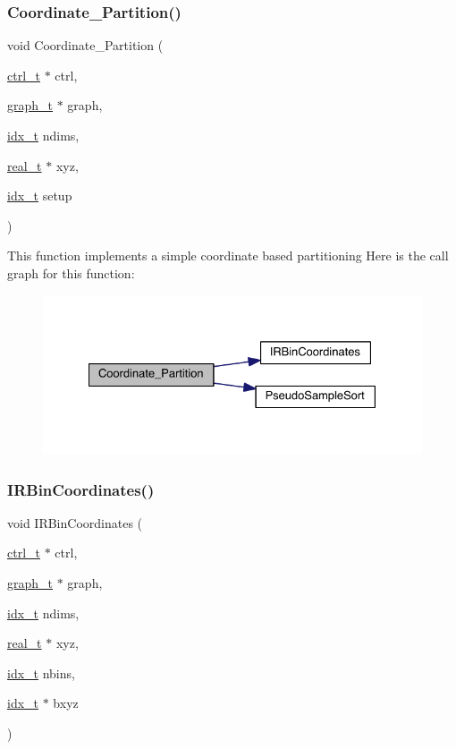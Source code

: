 \subsubsection{\texorpdfstring{Coordinate\+\_\+\+Partition()}{Coordinate\_Partition()}}
{\footnotesize\ttfamily void Coordinate\+\_\+\+Partition (\begin{DoxyParamCaption}\item[{\hyperlink{a00742}{ctrl\+\_\+t} $\ast$}]{ctrl,  }\item[{\hyperlink{a00734}{graph\+\_\+t} $\ast$}]{graph,  }\item[{\hyperlink{a00876_aaa5262be3e700770163401acb0150f52}{idx\+\_\+t}}]{ndims,  }\item[{\hyperlink{a00876_a1924a4f6907cc3833213aba1f07fcbe9}{real\+\_\+t} $\ast$}]{xyz,  }\item[{\hyperlink{a00876_aaa5262be3e700770163401acb0150f52}{idx\+\_\+t}}]{setup }\end{DoxyParamCaption})}

This function implements a simple coordinate based partitioning Here is the call graph for this function\+:\nopagebreak
\begin{figure}[H]
\begin{center}
\leavevmode
\includegraphics[width=328pt]{a00419_ab907c5a6cbed51a1027117aa083dcde0_cgraph}
\end{center}
\end{figure}
\mbox{\label{a00419_a868c9811f572c62917c5e8cc22dd92a9}} 
\subsubsection{\texorpdfstring{I\+R\+Bin\+Coordinates()}{IRBinCoordinates()}}
{\footnotesize\ttfamily void I\+R\+Bin\+Coordinates (\begin{DoxyParamCaption}\item[{\hyperlink{a00742}{ctrl\+\_\+t} $\ast$}]{ctrl,  }\item[{\hyperlink{a00734}{graph\+\_\+t} $\ast$}]{graph,  }\item[{\hyperlink{a00876_aaa5262be3e700770163401acb0150f52}{idx\+\_\+t}}]{ndims,  }\item[{\hyperlink{a00876_a1924a4f6907cc3833213aba1f07fcbe9}{real\+\_\+t} $\ast$}]{xyz,  }\item[{\hyperlink{a00876_aaa5262be3e700770163401acb0150f52}{idx\+\_\+t}}]{nbins,  }\item[{\hyperlink{a00876_aaa5262be3e700770163401acb0150f52}{idx\+\_\+t} $\ast$}]{bxyz }\end{DoxyParamCaption})}

